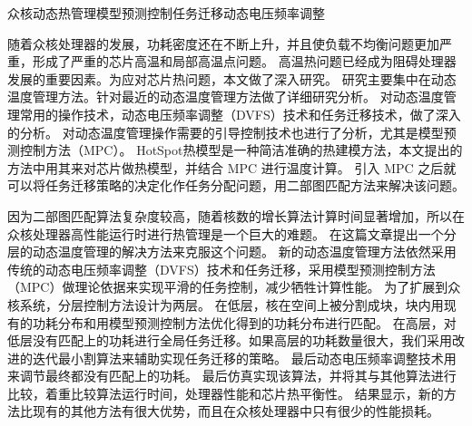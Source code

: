 
\begin{Cabstract}{众核}{动态热管理}{模型预测控制}{任务迁移}{动态电压频率调整}

随着众核处理器的发展，功耗密度还在不断上升，并且使负载不均衡问题更加严重，形成了严重的芯片高温和局部高温点问题。
高温热问题已经成为阻碍处理器发展的重要因素。为应对芯片热问题，本文做了深入研究。
研究主要集中在动态温度管理方法。针对最近的动态温度管理方法做了详细研究分析。
对动态温度管理常用的操作技术，动态电压频率调整（DVFS）技术和任务迁移技术，做了深入的分析。
对动态温度管理操作需要的引导控制技术也进行了分析，尤其是模型预测控制方法（MPC）。
HotSpot热模型是一种简洁准确的热建模方法，本文提出的方法中用其来对芯片做热模型，并结合 MPC 进行温度计算。
引入 MPC 之后就可以将任务迁移策略的决定化作任务分配问题，用二部图匹配方法来解决该问题。

因为二部图匹配算法复杂度较高，随着核数的增长算法计算时间显著增加，所以在众核处理器高性能运行时进行热管理是一个巨大的难题。
在这篇文章提出一个分层的动态温度管理的解决方法来克服这个问题。
新的动态温度管理方法依然采用传统的动态电压频率调整（DVFS）技术和任务迁移，采用模型预测控制方法（MPC）做理论依据来实现平滑的任务控制，减少牺牲计算性能。
为了扩展到众核系统，分层控制方法设计为两层。
在低层，核在空间上被分割成块，块内用现有的功耗分布和用模型预测控制方法优化得到的功耗分布进行匹配。
在高层，对低层没有匹配上的功耗进行全局任务迁移。如果高层的功耗数量很大，我们采用改进的迭代最小割算法来辅助实现任务迁移的策略。
最后动态电压频率调整技术用来调节最终都没有匹配上的功耗。
最后仿真实现该算法，并将其与其他算法进行比较，着重比较算法运行时间，处理器性能和芯片热平衡性。
结果显示，新的方法比现有的其他方法有很大优势，而且在众核处理器中只有很少的性能损耗。
\end{Cabstract}
